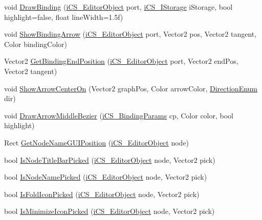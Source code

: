 \begin{DoxyCompactItemize}
\item 
void \hyperlink{classi_c_s___graphics_ac85c58ea643f0ea379db6227eee87208}{Draw\+Binding} (\hyperlink{classi_c_s___editor_object}{i\+C\+S\+\_\+\+Editor\+Object} port, \hyperlink{classi_c_s___i_storage}{i\+C\+S\+\_\+\+I\+Storage} i\+Storage, bool highlight=false, float line\+Width=1.\+5f)
\item 
void \hyperlink{classi_c_s___graphics_aa99940d34e7da7a79f073ae236b89319}{Show\+Binding\+Arrow} (\hyperlink{classi_c_s___editor_object}{i\+C\+S\+\_\+\+Editor\+Object} port, Vector2 pos, Vector2 tangent, Color binding\+Color)
\item 
Vector2 \hyperlink{classi_c_s___graphics_af9b9b7c1e59c9c1ed8fb16248a504d77}{Get\+Binding\+End\+Position} (\hyperlink{classi_c_s___editor_object}{i\+C\+S\+\_\+\+Editor\+Object} port, Vector2 end\+Pos, Vector2 tangent)
\item 
void \hyperlink{classi_c_s___graphics_a13f8a61a936cc4be2f88dfb1f58190d8}{Show\+Arrow\+Center\+On} (Vector2 graph\+Pos, Color arrow\+Color, \hyperlink{i_c_s___binding_params_8cs_a11549e9d2b70730fdddc367e341785ec}{Direction\+Enum} dir)
\item 
void \hyperlink{classi_c_s___graphics_a2c679dc47e2942a5e6e28328dfebb1f0}{Draw\+Arrow\+Middle\+Bezier} (\hyperlink{classi_c_s___binding_params}{i\+C\+S\+\_\+\+Binding\+Params} cp, Color color, bool highlight)
\item 
Rect \hyperlink{classi_c_s___graphics_ae845107cdad5d51c8d98239628a9549b}{Get\+Node\+Name\+G\+U\+I\+Position} (\hyperlink{classi_c_s___editor_object}{i\+C\+S\+\_\+\+Editor\+Object} node)
\item 
bool \hyperlink{classi_c_s___graphics_a4655b79e556fc5a1d36cafca9e81d7af}{Is\+Node\+Title\+Bar\+Picked} (\hyperlink{classi_c_s___editor_object}{i\+C\+S\+\_\+\+Editor\+Object} node, Vector2 pick)
\item 
bool \hyperlink{classi_c_s___graphics_ad1068f09a002fb1cfdc18ef85c205f70}{Is\+Node\+Name\+Picked} (\hyperlink{classi_c_s___editor_object}{i\+C\+S\+\_\+\+Editor\+Object} node, Vector2 pick)
\item 
bool \hyperlink{classi_c_s___graphics_a21eaafd5900b45632f4eee257cf9b78d}{Is\+Fold\+Icon\+Picked} (\hyperlink{classi_c_s___editor_object}{i\+C\+S\+\_\+\+Editor\+Object} node, Vector2 pick)
\item 
bool \hyperlink{classi_c_s___graphics_ac3a5c2b1b5bff3a7eec82b81bb07fc41}{Is\+Minimize\+Icon\+Picked} (\hyperlink{classi_c_s___editor_object}{i\+C\+S\+\_\+\+Editor\+Object} node, Vector2 pick)
\item 

\end{DoxyCompactItemize}
